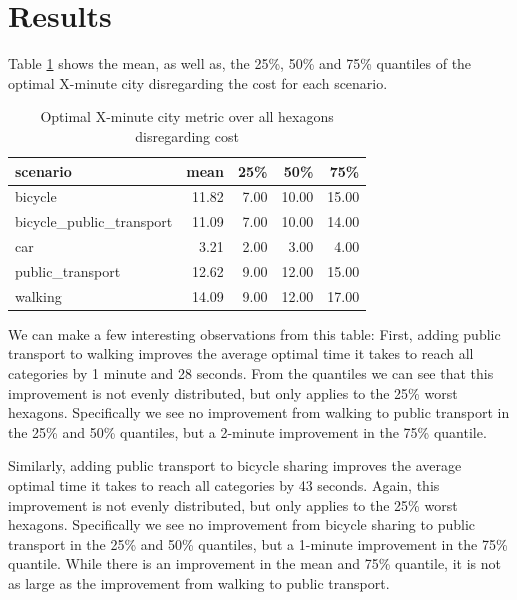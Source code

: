 \clearpage
\section{Results}
\label{sec:results}






Table \ref{tab:optimal_x_minute_city_metric} shows the mean, as well as, the 25\%, 50\% and 75\% quantiles of the optimal X-minute city disregarding the cost for each scenario.

\begin{table}
  \caption{Optimal X-minute city metric over all hexagons disregarding cost}
  \label{tab:optimal_x_minute_city_metric}
  \begin{center}
    \begin{tabular}{|l|r|r|r|r|}
    \hline
    scenario & mean & 25\% & 50\% & 75\% \\
    \hline
    bicycle & 11.82 & 7.00 & 10.00 & 15.00 \\
    \hline
    bicycle_public_transport & 11.09 & 7.00 & 10.00 & 14.00 \\
    \hline
    car & 3.21 & 2.00 & 3.00 & 4.00 \\
    \hline
    public_transport & 12.62 & 9.00 & 12.00 & 15.00 \\
    \hline
    walking & 14.09 & 9.00 & 12.00 & 17.00 \\
    \hline
    \end{tabular}
  \end{center}
\end{table}


We can make a few interesting observations from this table:
First, adding public transport to walking improves the average optimal time it takes to reach all categories by 1 minute and 28 seconds.
From the quantiles we can see that this improvement is not evenly distributed, but only applies to the 25\% worst hexagons.
Specifically we see no improvement from walking to public transport in the 25\% and 50\% quantiles, but a 2-minute improvement in the 75\% quantile.

Similarly, adding public transport to bicycle sharing improves the average optimal time it takes to reach all categories by 43 seconds.
Again, this improvement is not evenly distributed, but only applies to the 25\% worst hexagons.
Specifically we see no improvement from bicycle sharing to public transport in the 25\% and 50\% quantiles, but a 1-minute improvement in the 75\% quantile.
While there is an improvement in the mean and 75\% quantile, it is not as large as the improvement from walking to public transport.

